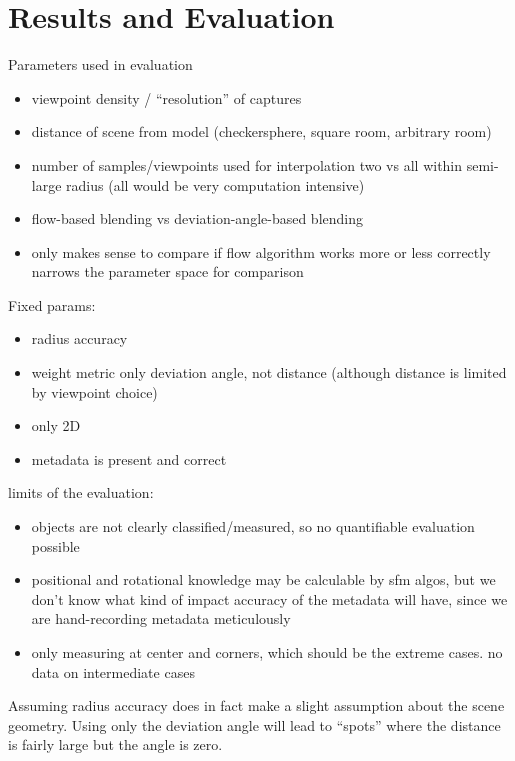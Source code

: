 \chapter{Results and Evaluation}


Parameters used in evaluation
\begin{itemize}
  \item viewpoint density / ``resolution'' of captures
  \item distance of scene from model (checkersphere, square room, arbitrary room)
  \item number of samples/viewpoints used for interpolation \ar two vs all within semi-large radius (all would be very computation intensive)
  \item flow-based blending vs deviation-angle-based blending
  \item only makes sense to compare if flow algorithm works more or less correctly \ar narrows the parameter space for comparison
\end{itemize}

Fixed params:
\begin{itemize}
  \item radius accuracy
  \item weight metric only deviation angle, not distance (although distance is limited by viewpoint choice)
  \item only 2D
  \item metadata is present and correct
\end{itemize}

limits of the evaluation:
\begin{itemize}
  \item objects are not clearly classified/measured, so no quantifiable evaluation possible
  \item positional and rotational knowledge may be calculable by sfm algos, but we don't know what kind of impact accuracy of the metadata will have, since we are hand-recording metadata meticulously
  \item only measuring at center and corners, which should be the extreme cases. no data on intermediate cases
\end{itemize}

Assuming radius accuracy does in fact make a slight assumption about the scene geometry. Using only the deviation angle will lead to ``spots'' where the distance is fairly large but the angle is zero. 

